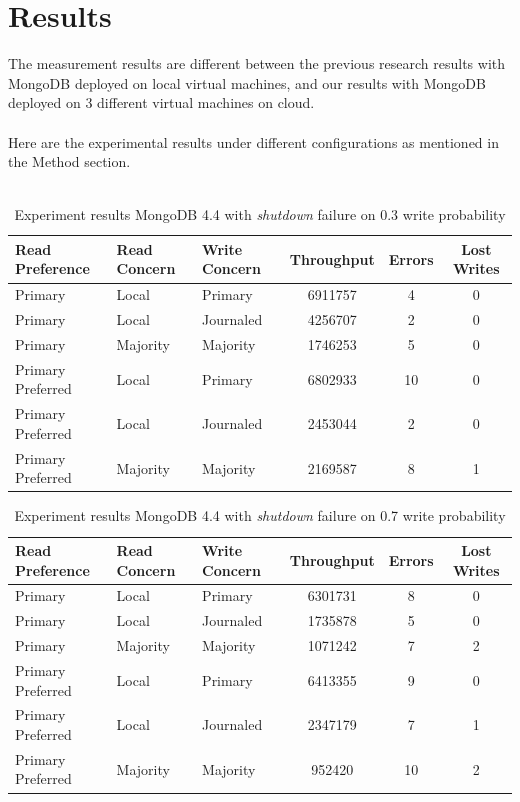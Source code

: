 \documentclass[12pt]{article}
\begin{document}
\section{Results}
The measurement results are different between the previous research results with MongoDB deployed on local virtual machines, and our results with MongoDB deployed on 3 different virtual machines on cloud.\\
\\
Here are the experimental results under different configurations as mentioned in the Method section. \\
\\
\begin{table}
    \begin{tabular}{@{}lllccc@{}}
      \hline
        Read Preference  & Read Concern & Write Concern & Throughput & Errors & Lost Writes \\
        \hline
        Primary          & Local        & Primary       & 6911757     & 4  & 0        \\
        Primary          & Local        & Journaled     & 4256707     & 2  & 0        \\
        Primary          & Majority     & Majority      & 1746253     & 5  & 0           \\
        Primary Preferred & Local        & Primary       & 6802933     & 10   & 0        \\
        Primary Preferred & Local        & Journaled     & 2453044     & 2    & 0         \\
        Primary Preferred & Majority     & Majority      & 2169587     & 8   & 1           \\
        \hline
        \end{tabular}
    \caption{Experiment results MongoDB 4.4 with \textit{shutdown} failure on 0.3 write probability}
\end{table}

\begin{table}
    \begin{tabular}{@{}lllccc@{}}
      \hline
        Read Preference  & Read Concern & Write Concern & Throughput & Errors & Lost Writes \\
        \hline
        Primary          & Local        & Primary       & 6301731     & 8  & 0        \\
        Primary          & Local        & Journaled     & 1735878     & 5  & 0        \\
        Primary          & Majority     & Majority      & 1071242     & 7  & 2           \\
        Primary Preferred & Local        & Primary       & 6413355     & 9   & 0        \\
        Primary Preferred & Local        & Journaled     & 2347179     & 7    & 1         \\
        Primary Preferred & Majority     & Majority      & 952420     & 10   & 2           \\
        \hline
        \end{tabular}
    \caption{Experiment results MongoDB 4.4 with \textit{shutdown} failure on 0.7 write probability}
\end{table}
\end{document}
